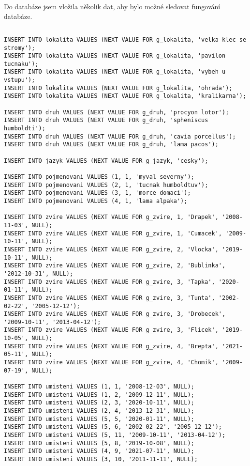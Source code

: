 \documentclass{article}
\begin{document}
Do databáze jsem vložila několik dat, aby bylo možné sledovat fungování databáze.

\begin{lstlisting}

INSERT INTO lokalita VALUES (NEXT VALUE FOR g_lokalita, 'velka klec se stromy');
INSERT INTO lokalita VALUES (NEXT VALUE FOR g_lokalita, 'pavilon tucnaku');
INSERT INTO lokalita VALUES (NEXT VALUE FOR g_lokalita, 'vybeh u vstupu');
INSERT INTO lokalita VALUES (NEXT VALUE FOR g_lokalita, 'ohrada');
INSERT INTO lokalita VALUES (NEXT VALUE FOR g_lokalita, 'kralikarna');

INSERT INTO druh VALUES (NEXT VALUE FOR g_druh, 'procyon lotor');
INSERT INTO druh VALUES (NEXT VALUE FOR g_druh, 'spheniscus humboldti');
INSERT INTO druh VALUES (NEXT VALUE FOR g_druh, 'cavia porcellus');
INSERT INTO druh VALUES (NEXT VALUE FOR g_druh, 'lama pacos');

INSERT INTO jazyk VALUES (NEXT VALUE FOR g_jazyk, 'cesky');

INSERT INTO pojmenovani VALUES (1, 1, 'myval severny');
INSERT INTO pojmenovani VALUES (2, 1, 'tucnak humboldtuv');
INSERT INTO pojmenovani VALUES (3, 1, 'morce domaci');
INSERT INTO pojmenovani VALUES (4, 1, 'lama alpaka');

INSERT INTO zvire VALUES (NEXT VALUE FOR g_zvire, 1, 'Drapek', '2008-11-03', NULL);
INSERT INTO zvire VALUES (NEXT VALUE FOR g_zvire, 1, 'Cumacek', '2009-10-11', NULL);
INSERT INTO zvire VALUES (NEXT VALUE FOR g_zvire, 2, 'Vlocka', '2019-10-11', NULL);
INSERT INTO zvire VALUES (NEXT VALUE FOR g_zvire, 2, 'Bublinka', '2012-10-31', NULL);
INSERT INTO zvire VALUES (NEXT VALUE FOR g_zvire, 3, 'Tapka', '2020-01-11', NULL);
INSERT INTO zvire VALUES (NEXT VALUE FOR g_zvire, 3, 'Tunta', '2002-02-22', '2005-12-12');
INSERT INTO zvire VALUES (NEXT VALUE FOR g_zvire, 3, 'Drobecek', '2009-10-11', '2013-04-12');
INSERT INTO zvire VALUES (NEXT VALUE FOR g_zvire, 3, 'Flicek', '2019-10-05', NULL);
INSERT INTO zvire VALUES (NEXT VALUE FOR g_zvire, 4, 'Brepta', '2021-05-11', NULL);
INSERT INTO zvire VALUES (NEXT VALUE FOR g_zvire, 4, 'Chomik', '2009-07-19', NULL);

INSERT INTO umisteni VALUES (1, 1, '2008-12-03', NULL);
INSERT INTO umisteni VALUES (1, 2, '2009-12-11', NULL);
INSERT INTO umisteni VALUES (2, 3, '2020-10-11', NULL);
INSERT INTO umisteni VALUES (2, 4, '2013-12-31', NULL);
INSERT INTO umisteni VALUES (5, 5, '2020-01-11', NULL);
INSERT INTO umisteni VALUES (5, 6, '2002-02-22', '2005-12-12');
INSERT INTO umisteni VALUES (5, 11, '2009-10-11', '2013-04-12');
INSERT INTO umisteni VALUES (5, 8, '2019-10-08', NULL);
INSERT INTO umisteni VALUES (4, 9, '2021-07-11', NULL);
INSERT INTO umisteni VALUES (3, 10, '2011-11-11', NULL);
\end{lstlisting}
\end{document}
